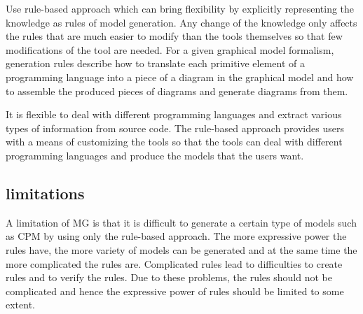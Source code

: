 \documentclass{article}
\begin{document}
Use rule-based approach which can bring flexibility by explicitly representing the knowledge as rules of model generation. Any change of the knowledge only affects the rules that are much easier to modify than the tools themselves so that few modifications of the tool are needed. For a given graphical model formalism, generation rules describe how to translate each primitive element of a programming language into a piece of a diagram in the graphical model and how to assemble the produced pieces of diagrams and generate diagrams from them.

It is flexible to deal with different programming languages and extract various types of information from source code. The rule-based approach provides users with a means of customizing the tools so that the tools can deal with different programming languages and produce the models that the users want.


\subsection{limitations}

A limitation of MG is that it is difficult to generate a certain type of models such as CPM by using only the rule-based approach. The more expressive power the rules have, the more variety of models can be generated and at the same time the more complicated the rules are. Complicated rules lead to difficulties to create rules and to verify the rules. Due to these problems, the rules should not be complicated and hence the expressive power of rules should be limited to some extent.
\end{document}
